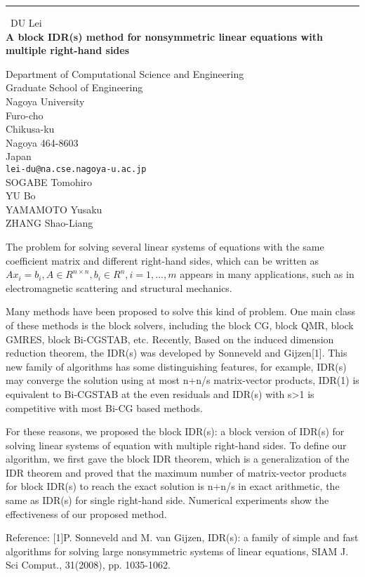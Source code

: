 \documentclass{report}
\begin{document}
\begin{center}
\rule{6in}{1pt} \
{\large DU Lei \\
{\bf A block IDR(s) method for nonsymmetric linear equations with multiple right-hand sides}}

Department of Computational Science and Engineering \\ Graduate School of Engineering \\ Nagoya University \\ Furo-cho \\ Chikusa-ku \\ Nagoya 464-8603 \\ Japan
\\
{\tt lei-du@na.cse.nagoya-u.ac.jp}\\
SOGABE Tomohiro\\
YU Bo\\
YAMAMOTO Yusaku\\
ZHANG Shao-Liang\end{center}

The problem for solving several linear systems of equations with the same
coefficient matrix and different right-hand sides, which can be written
as
$Ax_i=b_i, A\in R^{n\times n}, b_i\in R^n, i=1,...,m$
appears in many applications, such as in electromagnetic scattering and
structural mechanics.

Many methods have been proposed to solve this kind of problem. One main
class of these methods is the block solvers, including the block CG,
block QMR, block GMRES, block Bi-CGSTAB, etc.
Recently, Based on the induced dimension reduction theorem, the IDR(s)
was developed by Sonneveld and Gijzen[1]. This new family of algorithms
has some distinguishing features, for example, IDR(s) may converge the
solution using at most n+n/s matrix-vector products, IDR(1) is equivalent
to Bi-CGSTAB at the even residuals and IDR(s) with s>1 is competitive
with most Bi-CG based methods.

For these reasons, we proposed the block IDR(s): a block version of
IDR(s) for solving linear systems of equation with multiple right-hand
sides. To define our algorithm, we first gave the block IDR theorem,
which is a generalization of the IDR theorem and proved that the maximum
number of matrix-vector products for block IDR(s) to reach the exact
solution is n+n/s in exact arithmetic, the same as IDR(s) for single
right-hand side. Numerical experiments show the effectiveness of our
proposed method.

Reference:
[1]P. Sonneveld and M. van Gijzen, IDR(s): a family of simple and fast
algorithms for solving large nonsymmetric systems of linear equations,
SIAM J. Sci Comput., 31(2008), pp. 1035-1062.
\end{document}
